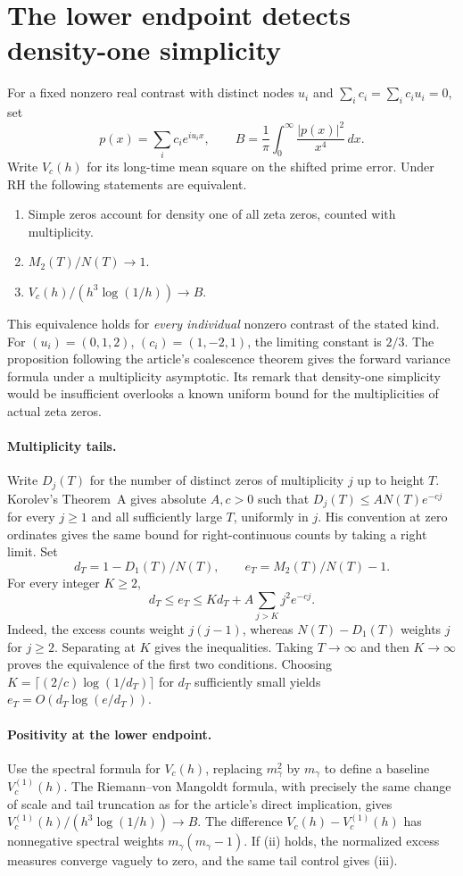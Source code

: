 \documentclass[11pt]{article}
\begin{document}
\section{The lower endpoint detects density-one simplicity}
For a fixed nonzero real contrast with distinct nodes $u_i$ and
$\sum_i c_i=\sum_i c_i u_i=0$, set
\[
 p(x)=\sum_i c_i e^{iu_i x},\qquad
 B=\frac1\pi\int_0^\infty\frac{|p(x)|^2}{x^4}\,dx.
\]
Write $V_c(h)$ for its long-time mean square on the shifted prime error. Under RH the following statements are equivalent.
\begin{enumerate}[label=\textup{(\roman*)}]
\item Simple zeros account for density one of all zeta zeros, counted with multiplicity.
\item $M_2(T)/N(T)\longrightarrow1$.
\item $V_c(h)/(h^3\log(1/h))\longrightarrow B$.
\end{enumerate}
This equivalence holds for \emph{every individual} nonzero contrast of the stated kind. For $(u_i)=(0,1,2)$, $(c_i)=(1,-2,1)$, the limiting constant is $2/3$. The proposition following the article's coalescence theorem gives the forward variance formula under a multiplicity asymptotic. Its remark that density-one simplicity would be insufficient overlooks a known uniform bound for the multiplicities of actual zeta zeros.

\paragraph{Multiplicity tails.}
Write $D_j(T)$ for the number of distinct zeros of multiplicity $j$ up to height $T$. Korolev's Theorem~A \cite{Korolev} gives absolute $A,c>0$ such that $D_j(T)\le A N(T)e^{-cj}$ for every $j\ge1$ and all sufficiently large $T$, uniformly in $j$. His convention at zero ordinates gives the same bound for right-continuous counts by taking a right limit. Set
\[
 d_T=1-D_1(T)/N(T),\qquad e_T=M_2(T)/N(T)-1 .
\]
For every integer $K\ge2$,
\[
 d_T\le e_T\le Kd_T+A\sum_{j>K}j^2 e^{-cj}.
\]
Indeed, the excess counts weight $j(j-1)$, whereas $N(T)-D_1(T)$ weights $j$ for $j\ge2$. Separating at $K$ gives the inequalities. Taking $T\to\infty$ and then $K\to\infty$ proves the equivalence of the first two conditions. Choosing $K=\lceil(2/c)\log(1/d_T)\rceil$ for $d_T$ sufficiently small yields $e_T=O(d_T\log(e/d_T))$.

\paragraph{Positivity at the lower endpoint.}
Use the spectral formula for $V_c(h)$, replacing $m_\gamma^2$ by $m_\gamma$ to define a baseline $V_c^{(1)}(h)$. The Riemann--von Mangoldt formula, with precisely the same change of scale and tail truncation as for the article's direct implication, gives $V_c^{(1)}(h)/(h^3\log(1/h))\to B$. The difference $V_c(h)-V_c^{(1)}(h)$ has nonnegative spectral weights $m_\gamma(m_\gamma-1)$. If (ii) holds, the normalized excess measures converge vaguely to zero, and the same tail control gives (iii).
\end{document}
